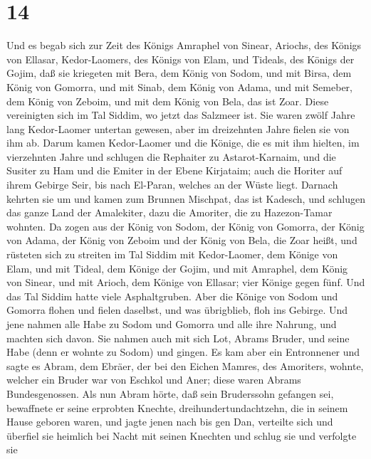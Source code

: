 \hypertarget{section-13}{%
\section{14}\label{section-13}}

 Und es begab sich zur Zeit des Königs Amraphel von
Sinear, Ariochs, des Königs von Ellasar, Kedor-Laomers, des Königs von
Elam, und Tideals, des Königs der Gojim,  daß sie
kriegeten mit Bera, dem König von Sodom, und mit Birsa, dem König von
Gomorra, und mit Sinab, dem König von Adama, und mit Semeber, dem König
von Zeboim, und mit dem König von Bela, das ist Zoar. 
Diese vereinigten sich im Tal Siddim, wo jetzt das Salzmeer ist.
 Sie waren zwölf Jahre lang Kedor-Laomer untertan gewesen,
aber im dreizehnten Jahre fielen sie von ihm ab.  Darum
kamen Kedor-Laomer und die Könige, die es mit ihm hielten, im
vierzehnten Jahre und schlugen die Rephaiter zu Astarot-Karnaim, und die
Susiter zu Ham und die Emiter in der Ebene Kirjataim; 
auch die Horiter auf ihrem Gebirge Seir, bis nach El-Paran, welches an
der Wüste liegt.  Darnach kehrten sie um und kamen zum
Brunnen Mischpat, das ist Kadesch, und schlugen das ganze Land der
Amalekiter, dazu die Amoriter, die zu Hazezon-Tamar wohnten.
 Da zogen aus der König von Sodom, der König von Gomorra,
der König von Adama, der König von Zeboim und der König von Bela, die
Zoar heißt, und rüsteten sich  zu streiten im Tal Siddim
mit Kedor-Laomer, dem Könige von Elam, und mit Tideal, dem Könige der
Gojim, und mit Amraphel, dem König von Sinear, und mit Arioch, dem
Könige von Ellasar; vier Könige gegen fünf.  Und das Tal
Siddim hatte viele Asphaltgruben. Aber die Könige von Sodom und Gomorra
flohen und fielen daselbst, und was übrigblieb, floh ins Gebirge.
 Und jene nahmen alle Habe zu Sodom und Gomorra und alle
ihre Nahrung, und machten sich davon.  Sie nahmen auch
mit sich Lot, Abrams Bruder, und seine Habe (denn er wohnte zu Sodom)
und gingen.  Es kam aber ein Entronnener und sagte es
Abram, dem Ebräer, der bei den Eichen Mamres, des Amoriters, wohnte,
welcher ein Bruder war von Eschkol und Aner; diese waren Abrams
Bundesgenossen.  Als nun Abram hörte, daß sein
Bruderssohn gefangen sei, bewaffnete er seine erprobten Knechte,
dreihundertundachtzehn, die in seinem Hause geboren waren, und jagte
jenen nach bis gen Dan,  verteilte sich und überfiel sie
heimlich bei Nacht mit seinen Knechten und schlug sie und verfolgte sie
